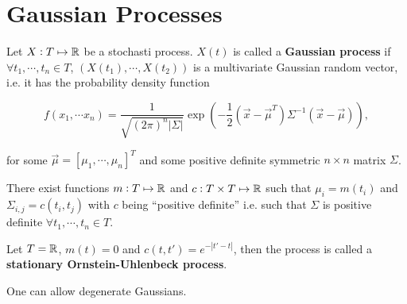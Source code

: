 \section{Gaussian Processes}

\begin{definition}
    Let $X: T \mapsto \mathbb{R}$ be a stochasti process. $X(t)$ is called a \textbf{Gaussian process} if $\forall t_1, \cdots, t_n \in T$, $(X(t_1), \cdots, X(t_2))$ is a multivariate Gaussian random vector, i.e. it has the probability density function 

    \begin{equation*}
        f(x_1, \cdots x_n) = \frac{1}{\sqrt{(2\pi)^n |\Sigma|}} \exp \left( - \frac{1}{2} (\vec{x} - \vec{\mu}^T) \Sigma^{-1} (\vec{x} - \vec{\mu}) \right),
    \end{equation*}

    for some $\vec{\mu} = [\mu_1, \cdots, \mu_n]^T$ and some positive definite symmetric $n\times n$ matrix $\Sigma$.
\end{definition}

\begin{proposition}
    There exist functions $m: T \mapsto \mathbb{R}$ and $c:T\times T \mapsto \mathbb{R}$ such that $\mu_i = m(t_i)$ and $\Sigma_{i,j} = c(t_i, t_j)$ with $c$ being ``positive definite'' i.e. such that $\Sigma$ is positive definite $\forall t_1, \cdots, t_n \in T$.
\end{proposition}

\begin{example}
    Let $T = \mathbb{R}$, $m(t) = 0$ and $c(t, t') = e^{-|t'-t|}$, then the process is called a \textbf{stationary Ornstein-Uhlenbeck process}.
\end{example}

One can allow degenerate Gaussians.